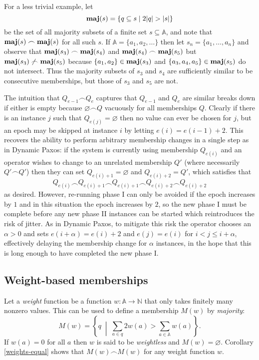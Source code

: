 \documentclass[journal]{IEEEtran}
\begin{document}
For a less trivial example, let \[\mathbf{maj}(s) = \{ q \subseteq s \mid 2 |q| > |s|
\}\] be the set of all majority subsets of a finite set $s \subseteq \mathbb
A$, and note that $\mathbf{maj}(s) \frown \mathbf{maj}(s)$ for all such $s$.  If $\mathbb A =
\{ a_1, a_2, \ldots \}$ then let $s_n = \{a_1, \ldots, a_n\}$ and observe that
${\mathbf{maj}(s_3) \frown \mathbf{maj}(s_4)}$ and ${\mathbf{maj}(s_4) \frown \mathbf{maj}(s_5)}$ but ${\mathbf{maj}(s_3)
\not\frown \mathbf{maj}(s_5)}$ because $\{a_1, a_2\} \in \mathbf{maj}(s_3)$ and $\{a_3, a_4,
a_5\} \in \mathbf{maj}(s_5)$ do not intersect. Thus the majority subsets of $s_3$ and
$s_4$ are sufficiently similar to be consecutive memberships, but those of
$s_3$ and $s_5$ are not.

The intuition that $Q_{e-1} \frown Q_e$ captures that $Q_{e-1}$ and $Q_e$ are
similar breaks down if either is empty because $\varnothing \frown Q$ vacuously
for all memberships $Q$. Clearly if there is an instance $j$ such that
$Q_{e(j)} = \varnothing$ then no value can ever be chosen for $j$, but an epoch
may be skipped at instance $i$ by letting $e(i) = e(i-1) + 2$.  This recovers
the ability to perform arbitrary membership changes in a single step as in
Dynamic Paxos: if the system is currently using membership $Q_{e(i)}$ and an
operator wishes to change to an unrelated membership $Q'$ (where necessarily
$Q' \frown Q'$) then they can set $Q_{e(i)+1} = \varnothing$ and $Q_{e(i)+2} =
Q'$, which satisfies that \[Q_{e(i)} \frown Q_{e(i) + 1} \frown Q_{e(i)+1}
\frown Q_{e(i) + 2} \frown Q_{e(i) + 2}\] as desired. However, re-running phase
I can only be avoided if the epoch increases by $1$ and in this situation the
epoch increases by $2$, so the new phase I must be complete before any new
phase II instances can be started which reintroduces the risk of jitter.  As in
Dynamic Paxos, to mitigate this risk the operator chooses an $\alpha > 0$ and
sets $e(i+\alpha) = e(i)+2$ and $e(j) = e(i)$ for $i < j \le i + \alpha$,
effectively delaying the membership change for $\alpha$ instances, in the hope
that this is long enough to have completed the new phase I.

\subsection{Weight-based memberships}
\label{weight-based-memberships}

Let a \textit{weight} function be a function $w : \mathbb A \to \mathbb N$ that
only takes finitely many nonzero values. This can be used to define a
membership $M(w)$ by \textit{majority}: \[M(w) = \left\{ q \;\middle|\; \sum_{a
\in q} 2 w(a) > \sum_{a \in \mathbb A} w(a) \right\}.\] If $w(a) = 0$ for all
$a$ then $w$ is said to be \textit{weightless} and $M(w) = \varnothing$.
Corollary \ref{weights-equal} shows that $M(w) \frown M(w)$ for any weight
function $w$.
\end{document}
